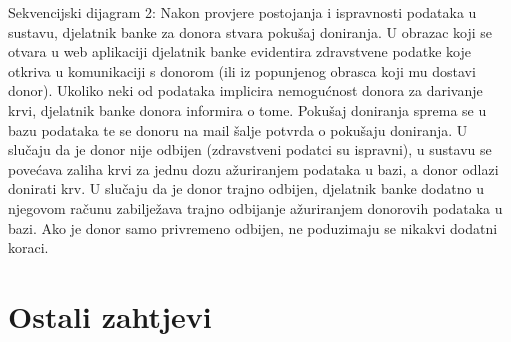 				\eject
				
				\par {
    	    	   Sekvencijski dijagram 2: Nakon provjere postojanja i ispravnosti podataka u sustavu, djelatnik banke za
donora stvara pokušaj doniranja. U obrazac koji se otvara u web aplikaciji
djelatnik banke evidentira zdravstvene podatke koje otkriva u komunikaciji s 
donorom (ili iz popunjenog obrasca koji mu dostavi donor).
Ukoliko neki od podataka implicira nemogućnost donora za darivanje krvi,
djelatnik banke donora informira o tome. Pokušaj doniranja sprema se u bazu podataka
te se donoru na mail šalje potvrda o pokušaju doniranja.
U slučaju da je donor nije odbijen (zdravstveni podatci su ispravni), u
sustavu se povećava zaliha krvi za jednu dozu ažuriranjem podataka u bazi, a
donor odlazi donirati krv.
U slučaju da je donor trajno odbijen, djelatnik banke dodatno u njegovom računu zabilježava
trajno odbijanje ažuriranjem donorovih podataka u bazi.
Ako je donor samo privremeno odbijen, ne poduzimaju se nikakvi dodatni koraci.
    	    	}
				
				
				
	
		\section{Ostali zahtjevi}
		
		 
			 
